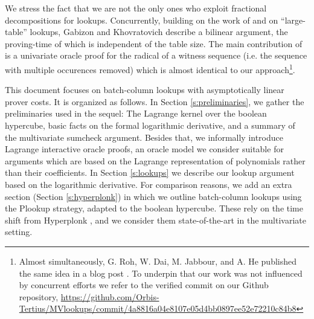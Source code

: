 \documentclass[11pt]{article}
\theoremstyle{definition}
\theoremstyle{definition}
\begin{document}
We stress the fact that we are not the only ones who exploit fractional decompositions for lookups. 
Concurrently, building on the work of \cite{Caulk} and \cite{CaulkPlus} on ``large-table'' lookups, Gabizon and Khovratovich \cite{flookup} describe a bilinear argument, the proving-time of which is independent of the table size. 
The main contribution of \cite{flookup} is a univariate oracle proof for the radical of a witness sequence (i.e. the sequence with multiple occurences removed) which is almost identical to our approach\footnote{%
Almost simultaneously, G. Roh, W. Dai, M. Jabbour, and A. He published the same idea in a blog post \cite{DaiFlookupBlog}.
To underpin that our work was not influenced by concurrent efforts we refer to the verified commit on our Github repository, 
\url{https://github.com/Orbis-Tertius/MVlookups/commit/4a8816a04e8107e05d4bb0897ee52e72210c84b8} 
}.

This document focuses on batch-column lookups with asymptotically linear prover costs.  
It is organized as follows.
In Section \ref{s:preliminaries}, we gather the preliminaries used in the sequel: 
The Lagrange kernel over the boolean hypercube,  basic facts on the formal logarithmic derivative, and a summary of the multivariate sumcheck argument. 
Besides that, we informally introduce Lagrange interactive oracle proofs, an oracle model we consider suitable for arguments which are based on the Lagrange representation of polynomials rather than their coefficients.   
In Section \ref{s:lookups} we describe our lookup argument based on the logarithmic derivative. 
For comparison reasons, we add an extra section (Section \ref{s:hyperplonk}) in which we outline batch-column lookups using the Plookup strategy, adapted to the boolean hypercube. 
These rely on the time shift from Hyperplonk \cite{Hyperplonk}, and we consider them state-of-the-art in the multivariate setting.
\end{document}
